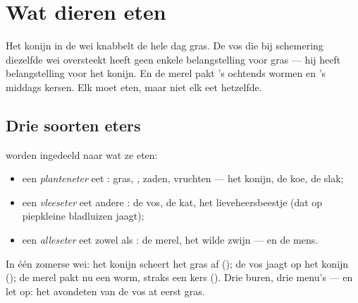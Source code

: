 \chapter{Wat dieren eten}\label{ch:g2:what-animals-eat}

Het konijn in de wei knabbelt de hele dag gras. De vos die bij
schemering diezelfde wei oversteekt heeft geen enkele belangstelling
voor gras --- hij heeft belangstelling voor het konijn. En de merel
pakt 's ochtends wormen en 's middags kersen. Elk  moet eten, maar
niet elk  eet hetzelfde.

\section{Drie soorten eters}

\begin{definition}\label{def:g2:what-animals-eat:kinds}
 worden ingedeeld naar wat ze eten:
\begin{itemize}
  \item een \emph{planteneter} eet : gras,
        , zaden, vruchten --- het konijn, de koe, de slak;
  \item een \emph{vleeseter} eet andere : de
        vos, de kat, het lieveheersbeestje (dat op piepkleine
        bladluizen jaagt);
  \item een \emph{alleseter} eet zowel  als
        : de merel, het wilde zwijn --- en de mens.
\end{itemize}
\end{definition}

\begin{example}\label{ex:g2:what-animals-eat:meadow}
In één zomerse wei: het konijn scheert het gras af (); de
vos jaagt op het konijn (); de merel pakt nu een worm, straks
een kers (). Drie buren, drie menu's --- en let op: het
avondeten van de vos at eerst gras.
\end{example}


